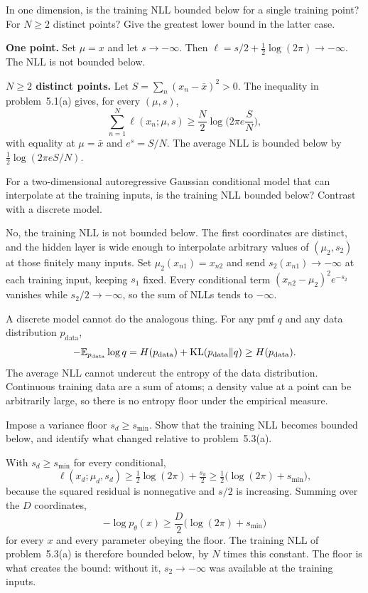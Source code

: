 \begin{hwqbox}
In one dimension, is the training NLL bounded below for a single training point? For $N\ge 2$ distinct points? Give the greatest lower bound in the latter case.
\end{hwqbox}
\begin{hwsolbox}
\textbf{One point.} Set $\mu=x$ and let $s\to-\infty$. Then $\ell=s/2+\tfrac12\log(2\pi)\to-\infty$. The NLL is not bounded below.

\textbf{$N\ge 2$ distinct points.} Let $S=\sum_n(x_n-\bar x)^2>0$. The inequality in problem~5.1(a) gives, for every $(\mu,s)$,
\[
\sum_{n=1}^N\ell(x_n;\mu,s)\ge\frac N2\log\Big(2\pi e\frac S N\Big),
\]
with equality at $\mu=\bar x$ and $e^s=S/N$. The average NLL is bounded below by $\tfrac12\log(2\pi e S/N)$.
\end{hwsolbox}

\begin{hwqbox}
For a two-dimensional autoregressive Gaussian conditional model that can interpolate at the training inputs, is the training NLL bounded below? Contrast with a discrete model.
\end{hwqbox}
\begin{hwsolbox}
No, the training NLL is not bounded below. The first coordinates are distinct, and the hidden layer is wide enough to interpolate arbitrary values of $(\mu_2,s_2)$ at those finitely many inputs. Set $\mu_2(x_{n1})=x_{n2}$ and send $s_2(x_{n1})\to-\infty$ at each training input, keeping $s_1$ fixed. Every conditional term $(x_{n2}-\mu_2)^2 e^{-s_2}$ vanishes while $s_2/2\to-\infty$, so the sum of NLLs tends to $-\infty$.

A discrete model cannot do the analogous thing. For any pmf $q$ and any data distribution $p_{\mathrm{data}}$,
\[
-\mathbb{E}_{p_{\mathrm{data}}}\log q=H(p_{\mathrm{data}})+\mathrm{KL}(p_{\mathrm{data}}\Vert q)\ge H(p_{\mathrm{data}}).
\]
The average NLL cannot undercut the entropy of the data distribution. Continuous training data are a sum of atoms; a density value at a point can be arbitrarily large, so there is no entropy floor under the empirical measure.
\end{hwsolbox}

\begin{hwqbox}
Impose a variance floor $s_d\ge s_{\min}$. Show that the training NLL becomes bounded below, and identify what changed relative to problem~5.3(a).
\end{hwqbox}
\begin{hwsolbox}
With $s_d\ge s_{\min}$ for every conditional,
\[
\ell(x_d;\mu_d,s_d)\ge\tfrac12\log(2\pi)+\tfrac{s_d}2\ge\tfrac12\big(\log(2\pi)+s_{\min}\big),
\]
because the squared residual is nonnegative and $s/2$ is increasing. Summing over the $D$ coordinates,
\[
-\log p_\theta(x)\ge\frac D2\big(\log(2\pi)+s_{\min}\big)
\]
for every $x$ and every parameter obeying the floor. The training NLL of problem~5.3(a) is therefore bounded below, by $N$ times this constant. The floor is what creates the bound: without it, $s_2\to-\infty$ was available at the training inputs.
\end{hwsolbox}

